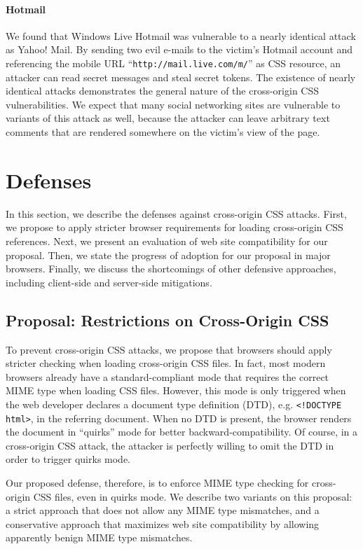 \documentclass{acm_proc_article-sp}
\begin{document}
\paragraph{Hotmail}
We found that Windows Live Hotmail was vulnerable to a nearly identical attack as Yahoo! Mail. By sending two evil e-mails to the victim's Hotmail account and referencing the mobile URL ``\texttt{http://mail.live.com/m/}'' as CSS resource, an attacker can read secret messages and steal secret tokens.
The existence of nearly identical attacks demonstrates the general nature of the cross-origin CSS vulnerabilities. We expect that many social networking sites are vulnerable to variants of this attack as well, because the attacker can leave arbitrary text comments that are rendered somewhere on the victim's view of the page.

\section{Defenses} \label{sec:defenses}
In this section, we describe the defenses against cross-origin CSS attacks.
First, we propose to apply stricter browser requirements for loading
cross-origin CSS references. Next, we present an evaluation of web site
compatibility for our proposal. Then, we state the progress of adoption for
our proposal in major browsers. Finally, we discuss the shortcomings of other
defensive approaches, including client-side and server-side mitigations.

\subsection{Proposal: Restrictions on Cross-Origin CSS}
To prevent cross-origin
CSS attacks, we propose that browsers should apply stricter checking when
loading cross-origin CSS files. In fact, most modern browsers already have a
standard-compliant mode that requires the correct MIME type when loading CSS
files. However, this mode is only triggered when the web developer declares a
document type definition (DTD), e.g. \verb|<!DOCTYPE html>|, in the referring
document. When no DTD is present, the browser renders the document in
``quirks'' mode for better backward-compatibility. Of course, in a
cross-origin CSS attack, the attacker is perfectly willing to omit the DTD in
order to trigger quirks mode.

Our proposed defense, therefore, is to enforce MIME type checking for
cross-origin CSS files, even in quirks mode. We describe two variants on this
proposal: a strict approach that does not allow any MIME type mismatches, and
a conservative approach that maximizes web site compatibility by allowing
apparently benign MIME type mismatches.
\end{document}
